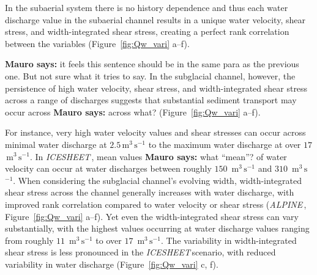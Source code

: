 \documentclass[draft]{agujournal2019}
\newcommand{\mauro}[1]{{\textbf{\color{green}Mauro says:} \color{green} #1} }
\newcommand{\alpine}{\textit{ALPINE}\,}
\newcommand{\icesheet}{\textit{ICESHEET}\,}
\newcommand{\unit}[1]{$\mathrm{#1}$}
\begin{document}
In the subaerial system there is no history dependence and thus each water discharge value in the subaerial channel results in a unique water velocity, shear stress, and width-integrated shear stress, creating a perfect rank correlation between the variables (Figure~\ref{fig:Qw_vari} a--f).

\mauro{it feels this sentence should be in the same para as the previous one.  But not sure what it tries to say.}
In the subglacial channel, however, the persistence of high water velocity, shear stress, and width-integrated shear stress across a range of discharges suggests that substantial sediment transport may occur across \mauro{across what?} (Figure~\ref{fig:Qw_vari} a--f).



For instance, very high  water velocity values and shear stresses can occur across minimal water discharge at $2.5$\,\unit{m}$^3$\,\unit{s}$^{-1}$ to the maximum water discharge at over $17$ \,\unit{m}$^3$\,\unit{s}$^{-1}$.
In \icesheet, mean values \mauro{what ``mean''?} of water velocity can occur at water discharges between roughly $150$ \,\unit{m}$^3$\,\unit{s}$^{-1}$ and $310$ \,\unit{m}$^3$\,\unit{s}$^{-1}$.
When considering the subglacial channel's evolving width, width-integrated shear stress  across the channel generally increases with water discharge, with improved rank correlation compared to water velocity or shear stress (\alpine, Figure~\ref{fig:Qw_vari} a--f).
Yet even the width-integrated shear stress  can vary substantially, with the highest values occurring at water discharge values ranging from roughly $11$ \,\unit{m}$^3$\,\unit{s}$^{-1}$ to over $17$ \,\unit{m}$^3$\,\unit{s}$^{-1}$.
The variability in width-integrated shear stress is less pronounced in the \icesheet scenario, with reduced variability in water discharge (Figure~\ref{fig:Qw_vari} c, f).
\end{document}
